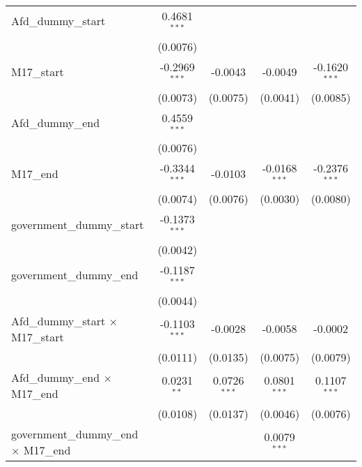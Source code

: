 \documentclass[10pt,a4paper]{article}
\begin{document}
\begin{tabular}{lcccc}
   Afd\_dummy\_start                            & 0.4681$^{***}$  &                 &                 &   \\   
                                                & (0.0076)        &                 &                 &   \\   
   M17\_start                                   & -0.2969$^{***}$ & -0.0043         & -0.0049         & -0.1620$^{***}$\\   
                                                & (0.0073)        & (0.0075)        & (0.0041)        & (0.0085)\\   
   Afd\_dummy\_end                              & 0.4559$^{***}$  &                 &                 &   \\   
                                                & (0.0076)        &                 &                 &   \\   
   M17\_end                                     & -0.3344$^{***}$ & -0.0103         & -0.0168$^{***}$ & -0.2376$^{***}$\\   
                                                & (0.0074)        & (0.0076)        & (0.0030)        & (0.0080)\\   
   government\_dummy\_start                     & -0.1373$^{***}$ &                 &                 &   \\   
                                                & (0.0042)        &                 &                 &   \\   
   government\_dummy\_end                       & -0.1187$^{***}$ &                 &                 &   \\   
                                                & (0.0044)        &                 &                 &   \\   
   Afd\_dummy\_start $\times$ M17\_start        & -0.1103$^{***}$ & -0.0028         & -0.0058         & -0.0002\\   
                                                & (0.0111)        & (0.0135)        & (0.0075)        & (0.0079)\\   
   Afd\_dummy\_end $\times$ M17\_end            & 0.0231$^{**}$   & 0.0726$^{***}$  & 0.0801$^{***}$  & 0.1107$^{***}$\\   
                                                & (0.0108)        & (0.0137)        & (0.0046)        & (0.0076)\\   
   government\_dummy\_end $\times$ M17\_end     &                 &                 & 0.0079$^{***}$  &   \\   

\end{tabular}
\end{document}
